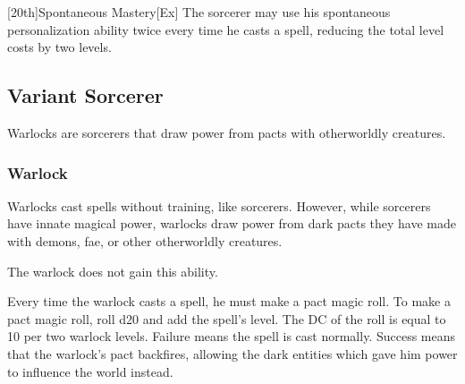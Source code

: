 [20th]{Spontaneous Mastery}[Ex]
The sorcerer may use his spontaneous personalization ability twice every time he casts a spell, reducing the total level costs by two levels.

\subsection{Variant Sorcerer}

Warlocks are sorcerers that draw power from pacts with otherworldly creatures.

\subsubsection{Warlock}

Warlocks cast spells without training, like sorcerers.
However, while sorcerers have innate magical power, warlocks draw power from dark pacts they have made with demons, fae, or other otherworldly creatures.

 The warlock does not gain this ability.

 Every time the warlock casts a spell, he must make a pact magic roll.
To make a pact magic roll, roll d20 and add the spell's level.
The DC of the roll is equal to 10  per two warlock levels.
Failure means the spell is cast normally.
Success means that the warlock's pact backfires, allowing the dark entities which gave him power to influence the world instead.

